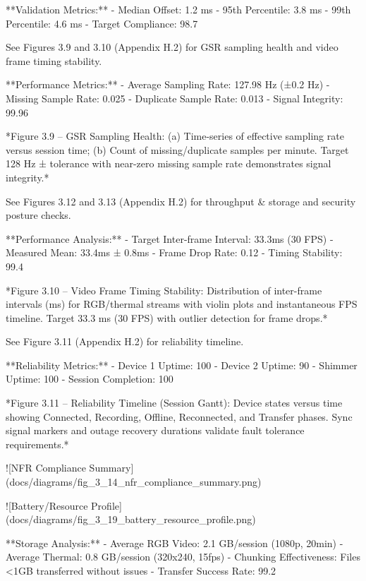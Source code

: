 \documentclass[12pt,a4paper]{article}
\begin{document}
**Validation Metrics:**
- Median Offset: 1.2 ms
- 95th Percentile: 3.8 ms  
- 99th Percentile: 4.6 ms
- Target Compliance: 98.7%

See Figures 3.9 and 3.10 (Appendix H.2) for GSR sampling health and video frame timing stability.

**Performance Metrics:**
- Average Sampling Rate: 127.98 Hz (±0.2 Hz)
- Missing Sample Rate: 0.025%
- Duplicate Sample Rate: 0.013%
- Signal Integrity: 99.96%

*Figure 3.9 – GSR Sampling Health: (a) Time-series of effective sampling rate versus session time; (b) Count of missing/duplicate samples per minute. Target 128 Hz ± tolerance with near-zero missing sample rate demonstrates signal integrity.*

See Figures 3.12 and 3.13 (Appendix H.2) for throughput & storage and security posture checks.

**Performance Analysis:**
- Target Inter-frame Interval: 33.3ms (30 FPS)
- Measured Mean: 33.4ms ± 0.8ms
- Frame Drop Rate: 0.12%
- Timing Stability: 99.4%

*Figure 3.10 – Video Frame Timing Stability: Distribution of inter-frame intervals (ms) for RGB/thermal streams with violin plots and instantaneous FPS timeline. Target 33.3 ms (30 FPS) with outlier detection for frame drops.*

See Figure 3.11 (Appendix H.2) for reliability timeline.

**Reliability Metrics:**
- Device 1 Uptime: 100%
- Device 2 Uptime: 90%
- Shimmer Uptime: 100%
- Session Completion: 100%

*Figure 3.11 – Reliability Timeline (Session Gantt): Device states versus time showing Connected, Recording, Offline, Reconnected, and Transfer phases. Sync signal markers and outage recovery durations validate fault tolerance requirements.*

![NFR Compliance Summary](docs/diagrams/fig_3_14_nfr_compliance_summary.png)

![Battery/Resource Profile](docs/diagrams/fig_3_19_battery_resource_profile.png)

**Storage Analysis:**
- Average RGB Video: 2.1 GB/session (1080p, 20min)
- Average Thermal: 0.8 GB/session (320x240, 15fps)
- Chunking Effectiveness: Files <1GB transferred without issues
- Transfer Success Rate: 99.2%
\end{document}
